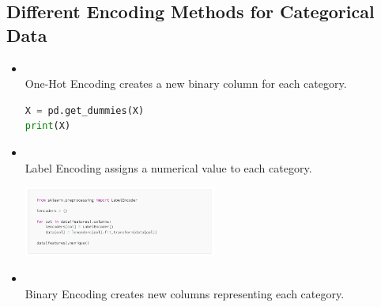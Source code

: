 \documentclass{article}
\begin{document}
\subsection{Different Encoding Methods for Categorical Data}
\begin{itemize}
    \item \textbf{\textcolor{blue}{}}\\
    One-Hot Encoding creates a new binary column for each category.
    \begin{lstlisting}[language=Python]
X = pd.get_dummies(X)
print(X)
    \end{lstlisting}
    \item \textbf{\textcolor{blue}{}}\\
    Label Encoding assigns a numerical value to each category.
    \begin{center}
        \includegraphics[width=0.5\textwidth]{label encoding} %
    \end{center}
    \item \textbf{\textcolor{blue}{}}\\
    Binary Encoding creates new columns representing each category.
\end{itemize}
\end{document}
